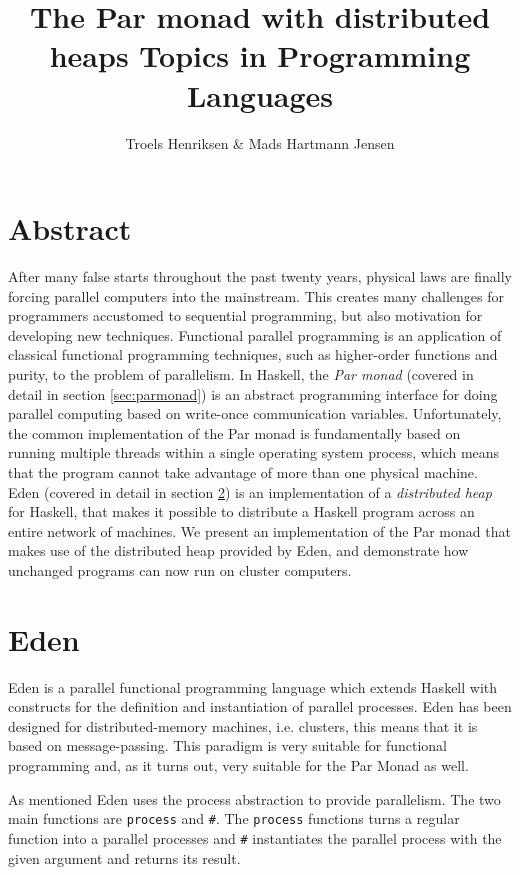 \documentclass[a4paper, oneside, final]{article}
\title{The Par monad with distributed heaps \newline \large{Topics in Programming Languages}}
\author{Troels Henriksen \& Mads Hartmann Jensen}
\begin{document}
\maketitle

\section{Abstract}

After many false starts throughout the past twenty years, physical
laws are finally forcing parallel computers into the mainstream.  This
creates many challenges for programmers accustomed to sequential
programming, but also motivation for developing new techniques.
Functional parallel programming is an application of classical
functional programming techniques, such as higher-order functions and
purity, to the problem of parallelism.  In Haskell, the \textit{Par
  monad} (covered in detail in section \ref{sec:parmonad}) is an
abstract programming interface for doing parallel computing based on
write-once communication variables.  Unfortunately, the common
implementation of the Par monad is fundamentally based on running
multiple threads within a single operating system process, which means
that the program cannot take advantage of more than one physical
machine.  Eden (covered in detail in section \ref{sec:eden}) is an
implementation of a \textit{distributed heap} for Haskell, that makes
it possible to distribute a Haskell program across an entire network
of machines.  We present an implementation of the Par monad that makes
use of the distributed heap provided by Eden, and demonstrate how
unchanged programs can now run on cluster computers.

\newpage 

\section{Eden}
\label{sec:eden}

Eden is a parallel functional programming language which extends
Haskell with constructs for the definition and instantiation of
parallel processes. Eden has been designed for distributed-memory
machines, i.e. clusters, this means that it is based on 
message-passing. This paradigm is very suitable for functional
programming and, as it turns out, very suitable for the Par Monad
as well. 

As mentioned Eden uses the process abstraction to provide parallelism.
The two main functions are \texttt{process} and \texttt{\#}. The
\texttt{process} functions turns a regular function into a parallel
processes and \texttt{\#} instantiates the parallel process with the
given argument and returns its result. \newline 
\end{document}
